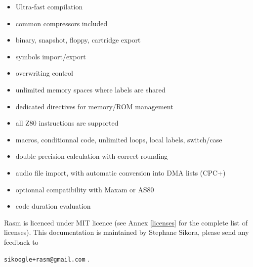 \begin{xen}
\begin{itemize}[noitemsep]
\item Ultra-fast compilation
\item common compressors included
\item binary, snapshot, floppy, cartridge export
\item symbols import/export
\item overwriting control
\item unlimited memory spaces where labels are shared
\item dedicated directives for memory/ROM management
\item all Z80 instructions are supported
\item macros, conditionnal code, unlimited loops, local labels, switch/case
\item double precision calculation with correct rounding
\item audio file import, with automatic conversion into DMA lists (CPC+)
\item optionnal compatibility with Maxam or AS80
\item code duration evaluation
\end{itemize}

Rasm is licenced under MIT licence (see Annex \ref{licenses} for the complete list of licenses).
\medbreak
This documentation is maintained by Stephane Sikora, please send any feedback to

\texttt{sikoogle+rasm@gmail.com} .

\end{xen}

